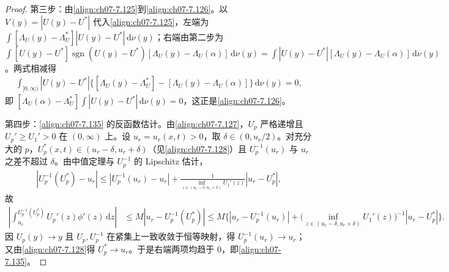 \documentclass[../../main.tex]{subfiles}%
\begin{document}
\begin{proof}
第三步：由\eqref{align:ch07-7.125}到\eqref{align:ch07-7.126}。以 $V(y)=|U(y)-U^*|$ 代入\eqref{align:ch07-7.125}，左端为 $\int[\Lambda_U(y)-\Lambda_U^*]|U(y)-U^*|\,\mathrm{d}\nu(y)$；右端由第二步为 $\int[U(y)-U^*]\operatorname{sgn}(U(y)-U^*)[\Lambda_U(y)-\Lambda_U(\alpha)]\,\mathrm{d}\nu(y)=\int|U(y)-U^*|[\Lambda_U(y)-\Lambda_U(\alpha)]\,\mathrm{d}\nu(y)$。两式相减得
\begin{align*}
\int_{[0,\infty)}|U(y)-U^*|\big\{[\Lambda_U(y)-\Lambda_U^*]-[\Lambda_U(y)-\Lambda_U(\alpha)]\big\}\,\mathrm{d}\nu(y)=0,
\end{align*}
即 $[\Lambda_U(\alpha)-\Lambda_U^*]\int|U(y)-U^*|\,\mathrm{d}\nu(y)=0$，这正是\eqref{align:ch07-7.126}。

第四步：\eqref{align:ch07-7.135} 的反函数估计。由\eqref{align:ch07-7.127}，$U_p$ 严格递增且 $U_p'\geqslant U_1'>0$ 在 $(0,\infty)$ 上。设 $u_r=u_r(x,t)>0$，取 $\delta\in(0,u_r/2)$。对充分大的 $p$，$U_p^*(x,t)\in(u_r-\delta,u_r+\delta)$（见\eqref{align:ch07-7.128}）且 $U_p^{-1}(u_r)$ 与 $u_r$ 之差不超过 $\delta$。由中值定理与 $U_p^{-1}$ 的 Lipschitz 估计，
\begin{align*}
|U_p^{-1}(U_p^*)-u_r|\leqslant|U_p^{-1}(u_r)-u_r|+\frac{1}{\inf_{z\in(u_r-\delta,u_r+\delta)}U_1'(z)}|u_r-U_p^*|,
\end{align*}
故
\begin{align*}
\left|\int_{u_r}^{U_p^{-1}(U_p^*)}U_p'(z)\phi'(z)\,\mathrm{d}z\right|
&\leqslant M|u_r-U_p^{-1}(U_p^*)|
\leqslant M\Big\{|u_r-U_p^{-1}(u_r)|+\Big(\inf_{z\in(u_r-\delta,u_r+\delta)}U_1'(z)\Big)^{-1}|u_r-U_p^*|\Big\}.
\end{align*}
因 $U_p(y)\to y$ 且 $U_p,U_p^{-1}$ 在紧集上一致收敛于恒等映射，得 $U_p^{-1}(u_r)\to u_r$；又由\eqref{align:ch07-7.128}得 $U_p^*\to u_r$。于是右端两项均趋于 $0$，即\eqref{align:ch07-7.135}。
\end{proof}
\end{document}

